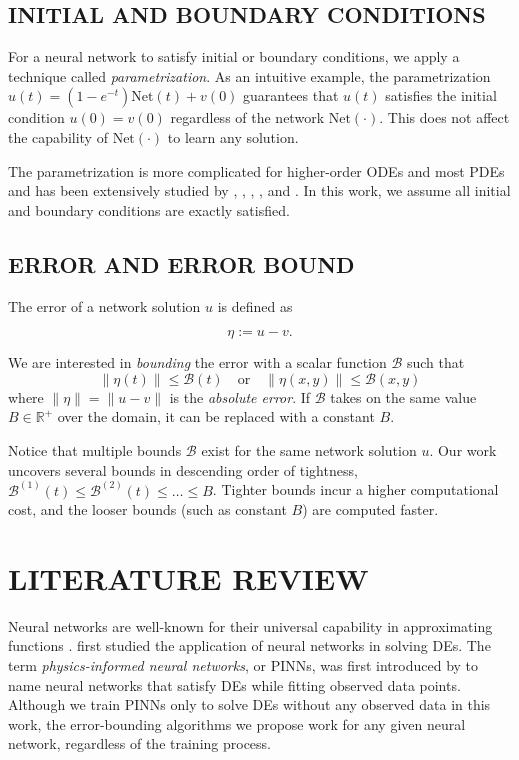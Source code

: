\documentclass{uai2023}
\newcommand{\Err}{\eta}
\newcommand{\Bound}{\mathcal{B}}
\newcommand{\Net}{\mathrm{Net}}
\begin{document}
\subsection{INITIAL AND BOUNDARY CONDITIONS}\label{section:initial-and-boundary-conditions}
    For a neural network to satisfy initial or boundary conditions, we apply a technique called \textit{parametrization}. 
    As an intuitive example, the parametrization $u(t) = (1 - e^{-t}) \Net(t) + v(0)$ guarantees that $u(t)$ satisfies the initial condition $u(0)=v(0)$ regardless of the network $\Net(\cdot)$.
    This does not affect the capability of $\Net(\cdot)$ to learn any solution.

    The parametrization is more complicated for higher-order ODEs and most PDEs and has been extensively studied by \cite{lagaris1998artificial}, \cite{lagaris2000neural}, \cite{mcfall2009artificial}, \cite{lagari2020systematic}, and \cite{sukumar2021exact}.
    In this work, we assume all initial and boundary conditions are exactly satisfied.

\subsection{ERROR AND ERROR BOUND}
    The error of a network solution $u$ is defined as 
    {
        \small
        \begin{equation}
            \Err := u - v.
        \end{equation}

    }
    We are interested in \textit{bounding} the error with a scalar function $\Bound$ such that 
    {
        \small
        \begin{equation}
            \|\Err(t)\| \leq \Bound(t) \quad \text{or} \quad \|\Err(x, y)\| \leq \Bound(x, y)
        \end{equation}
    }
    where $\|\Err\| = \|u - v\|$ is the \textit{absolute error}.
    If $\Bound$ takes on the same value $B \in \mathbb{R}^{+}$ over the domain, it can be replaced with a constant $B$.

    Notice that multiple bounds $\Bound$ exist for the same network solution $u$.
    Our work uncovers several bounds in descending order of tightness, $\Bound^{(1)}(t) \leq  \Bound^{(2)}(t) \leq \dots \leq B$. Tighter bounds incur a higher computational cost, and the looser bounds (such as constant $B$) are computed faster.

\section{LITERATURE REVIEW} \label{section:literature-review}
    Neural networks are well-known for their universal capability in approximating functions \citep{hornik1989multilayer}. 
    \citeauthor{lagaris1998artificial} first studied the application of neural networks in solving DEs.
    The term \textit{physics-informed neural networks}, or PINNs, was first introduced by \citeauthor{raissi2019physics} to name neural networks that satisfy DEs while fitting observed data points. 
    Although we train PINNs only to solve DEs without any observed data in this work, the error-bounding algorithms we propose work for any given neural network, regardless of the training process.
\end{document}
